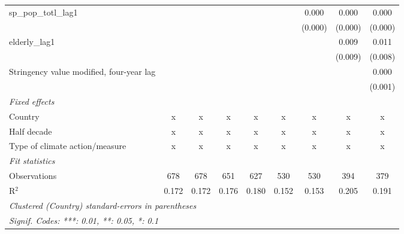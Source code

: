 \begin{tabular}{lcccccccc}
   sp\_pop\_totl\_lag1                               &         &         &         &         &               & 0.000         & 0.000         & 0.000\\   
                                                     &         &         &         &         &               & (0.000)       & (0.000)       & (0.000)\\   
   elderly\_lag1                                     &         &         &         &         &               &               & 0.009         & 0.011\\   
                                                     &         &         &         &         &               &               & (0.009)       & (0.008)\\   
   Stringency value modified, four-year lag          &         &         &         &         &               &               &               & 0.000\\   
                                                     &         &         &         &         &               &               &               & (0.001)\\   
   \emph{Fixed effects}\\
   Country                                           & x       & x       & x       & x       & x             & x             & x             & x\\  
   Half decade                                       & x       & x       & x       & x       & x             & x             & x             & x\\  
   Type of climate action/measure                    & x       & x       & x       & x       & x             & x             & x             & x\\  
   \midrule \emph{Fit statistics}\\
   Observations                                      & 678     & 678     & 651     & 627     & 530           & 530           & 394           & 379\\  
   R$^2$                                             & 0.172   & 0.172   & 0.176   & 0.180   & 0.152         & 0.153         & 0.205         & 0.191\\  
   \midrule
   \multicolumn{9}{l}{\emph{Clustered (Country) standard-errors in parentheses}}\\
   \multicolumn{9}{l}{\emph{Signif. Codes: ***: 0.01, **: 0.05, *: 0.1}}\\
\end{tabular}
\par\endgroup



